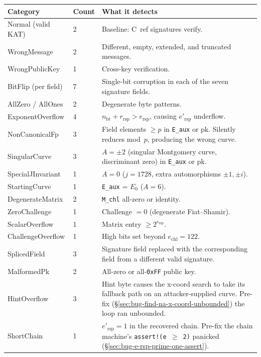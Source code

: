 \begin{table}[ht]
\centering
\small
\begin{tabular}{@{}llp{}@{}}
\toprule
\textbf{Category} & \textbf{Count} & \textbf{What it detects} \\
\midrule
Normal (valid KAT) & 2 & Baseline: C~ref signatures verify. \\
WrongMessage & 2 & Different, empty, extended, and truncated
  messages. \\
WrongPublicKey & 1 & Cross-key verification. \\
BitFlip (per field) & 7 & Single-bit corruption in each of the seven
  signature fields. \\
AllZero / AllOnes & 2 & Degenerate byte patterns. \\
ExponentOverflow & 4 & $n_{\mathrm{bt}} + r_{\mathrm{rsp}} > e_{\mathrm{rsp}}$,
  causing $e'_{\mathrm{rsp}}$ underflow. \\
NonCanonicalFp & 3 & Field elements $\ge p$ in \texttt{E\_aux} or pk.
  Silently reduces mod~$p$, producing the wrong curve. \\
SingularCurve & 3 & $A = \pm 2$ (singular Montgomery curve,
  discriminant zero) in \texttt{E\_aux} or pk. \\
SpecialJInvariant & 1 & $A = 0$ ($j = 1728$, extra automorphisms
  $\pm 1, \pm i$). \\
StartingCurve & 1 & \texttt{E\_aux} = $E_0$ ($A = 6$). \\
DegenerateMatrix & 2 & \texttt{M\_chl} all-zero or identity. \\
ZeroChallenge & 1 & Challenge $= 0$ (degenerate Fiat--Shamir). \\
ScalarOverflow & 1 & Matrix entry $\ge 2^{e_{\mathrm{rsp}}}$. \\
ChallengeOverflow & 1 & High bits set beyond $e_{\mathrm{chl}} = 122$. \\
SplicedField & 3 & Signature field replaced with the corresponding
  field from a different valid signature. \\
MalformedPk & 2 & All-zero or all-\texttt{0xFF} public key. \\
HintOverflow & 3 & Hint byte causes the x-coord search to take its
  fallback path on an attacker-supplied curve.  Pre-fix
  (\S\ref{sec:bug-find-na-x-coord-unbounded}) the loop ran
  unbounded. \\
ShortChain & 1 & $e'_{\mathrm{rsp}} = 1$ in the recovered chain.
  Pre-fix the chain machine's \texttt{assert!(e \(\geq\) 2)}
  panicked
  (\S\ref{sec:bug-e-rsp-prime-one-assert}). \\

\end{tabular}
\end{table}
